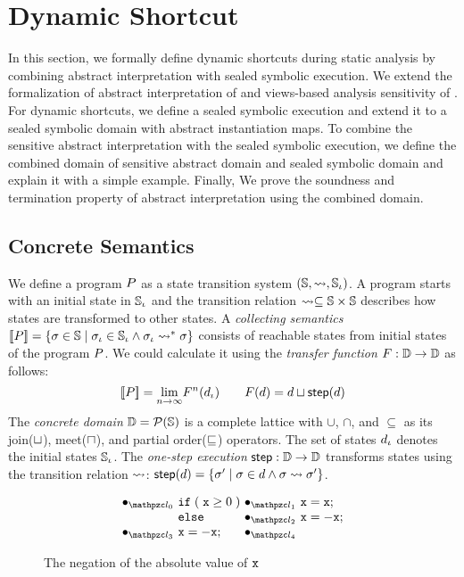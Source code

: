 \section{Dynamic Shortcut}\label{sec:formal}

In this section, we formally define dynamic shortcuts during static analysis by
combining abstract interpretation with sealed symbolic execution.  We extend the
formalization of abstract interpretation of \citet{abs-interp-1977,
abs-interp-1992} and views-based analysis sensitivity of \citet{sens-toplas}.
For dynamic shortcuts, we define a sealed symbolic execution and extend it to a
sealed symbolic domain with abstract instantiation maps.  To combine the
sensitive abstract interpretation with the sealed symbolic execution, we define
the combined domain of sensitive abstract domain and sealed symbolic domain and
explain it with a simple example. Finally, We prove the soundness and
termination property of abstract interpretation using the combined domain.


\subsection{Concrete Semantics}

We define a program $P$ as a state transition system $(\mathbb{S}, \leadsto,
\mathbb{S}_\iota)$.  A program starts with an initial state in $\mathbb{S}_\iota$ and the
transition relation $\leadsto \subseteq \mathbb{S} \times \mathbb{S}$ describes how states
are transformed to other states.  A \textit{collecting semantics} $[\![{P}]\!] =
\{ \sigma \in \mathbb{S} \mid \sigma_\iota \in \mathbb{S}_\iota \wedge \sigma_\iota \leadsto^* \sigma \}$ consists of
reachable states from initial states of the program $P$.  We could calculate
it using the \textit{transfer function} $F: \mathbb{D} \rightarrow \mathbb{D}$ as
follows:
\[
  [\![{P}]\!] = \underset{n \rightarrow \infty}{\lim}{F^n(d_\iota)}\\
  \qquad
  F(d) = d \sqcup \textsf{step}(d)\\
\]
The \textit{concrete domain} $\mathbb{D} = \mathcal{P}(\mathbb{S})$ is a complete lattice
with $\cup$, $\cap$, and $\subseteq$ as its join($\sqcup$), meet($\sqcap$), and
partial order($\sqsubseteq$) operators.  The set of states $d_\iota$ denotes the
initial states $\mathbb{S}_\iota$.  The \textit{one-step execution} $\textsf{step}: \mathbb{D}
\rightarrow \mathbb{D}$ transforms states using the transition relation $\leadsto$:
$\textsf{step}(d) = \{ \sigma' \mid \sigma \in d \wedge \sigma \leadsto \sigma' \}$.

\begin{figure}[H]
  \[
    \begin{array}{r@{~}l@{~}c@{~}l}
      \labdot{0} & \kwif \; (\; \varx \geq 0 \;) & \labdot{1} & \varx = \varx ;\\
                 & \kwelse & \labdot{2} & \varx = -\varx ;\\
      \labdot{3} & \varx = -\varx ; & \labdot{4} \\
    \end{array}
  \]
  \vspace*{-1em}
  \caption{The negation of the absolute value of $\texttt{x}$}
  \label{fig:running-example}
\end{figure}

